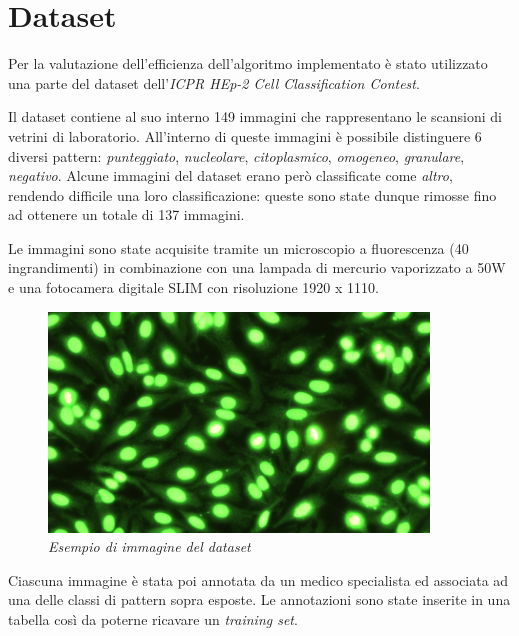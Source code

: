 \section{Dataset}

Per la valutazione dell'efficienza dell'algoritmo implementato è stato utilizzato una parte del dataset dell'\emph{ICPR HEp-2 Cell Classification Contest}.

Il dataset contiene al suo interno 149 immagini che rappresentano le scansioni di vetrini di laboratorio. All'interno di queste immagini è possibile distinguere 6 diversi pattern: \emph{punteggiato}, \emph{nucleolare}, \emph{citoplasmico}, \emph{omogeneo}, \emph{granulare}, \emph{negativo}. Alcune immagini del dataset erano però classificate come \emph{altro}, rendendo difficile una loro classificazione: queste sono state dunque rimosse fino ad ottenere un totale di 137 immagini.

Le immagini sono state acquisite tramite un microscopio a fluorescenza (40 ingrandimenti) in combinazione con una lampada di mercurio vaporizzato a 50W e una fotocamera digitale SLIM con risoluzione 1920 x 1110.

\begin{figure}[H] 
  \centering
    \includegraphics[width=0.9\textwidth]{images/example.jpg}
    \caption{{\small \textit{Esempio di immagine del dataset}}}
\end{figure}

Ciascuna immagine è stata poi annotata da un medico specialista ed associata ad una delle classi di pattern sopra esposte. Le annotazioni sono state inserite in una tabella così da poterne ricavare un \emph{training set}.


